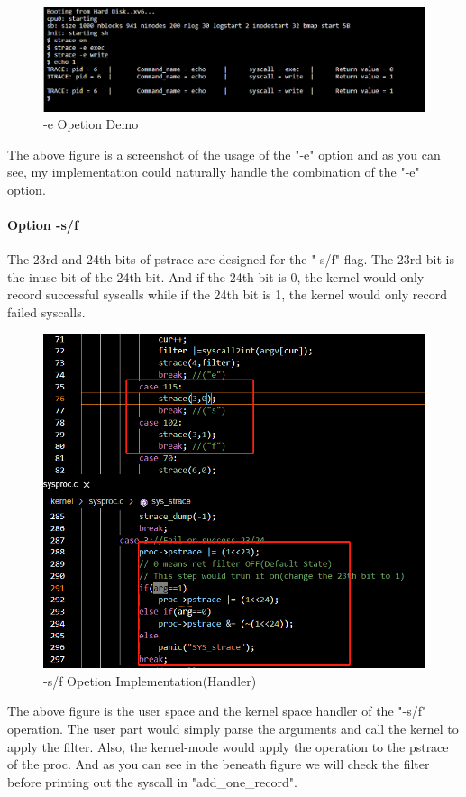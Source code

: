 \documentclass[11pt,oneside,a4paper]{article}
\begin{document}
\begin{figure}[H]
    \includegraphics[width=4.75in]{1-21.png}
    \centering
    \caption{-e Opetion Demo}
\end{figure}


The above figure is a screenshot of the usage of the "-e" option and as you can see, 
my implementation could naturally handle the combination of the "-e" option.

\paragraph*{Option -s/f}

The 23rd and 24th bits of pstrace are designed for the "-s/f" flag. The 23rd bit is the 
inuse-bit of the 24th bit. And if the 24th bit is 0, the kernel would only record successful
syscalls while if the 24th bit is 1, the kernel would only record failed syscalls.

\begin{figure}[H]
    \includegraphics[width=4.75in]{1-22.png}
    \centering
    \caption{-s/f Opetion Implementation(Handler)}
\end{figure}

The above figure is the user space and the kernel space handler of the "-s/f" operation.
The user part would simply parse the arguments and call the kernel to apply the filter.
Also, the kernel-mode would apply the operation to the pstrace of the proc. And as you
can see in the beneath figure we will check the filter before printing out the syscall in "add\_one\_record".
\end{document}
